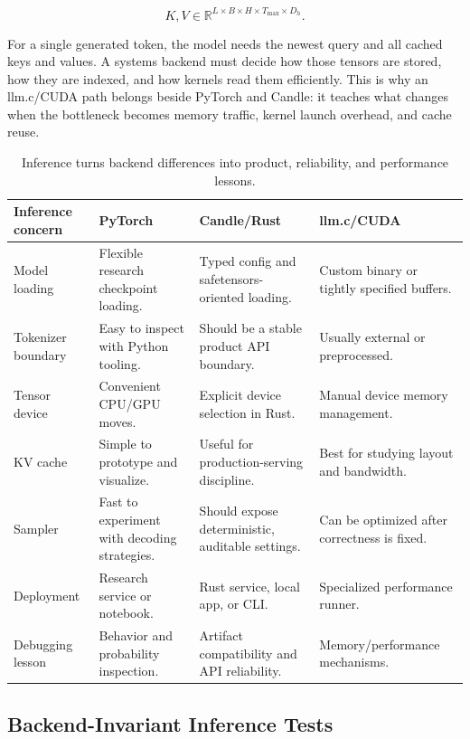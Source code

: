 \[
K,V \in \mathbb{R}^{L \times B \times H \times T_{\max} \times D_h}.
\]

For a single generated token, the model needs the newest query and all cached keys and
values. A systems backend must decide how those tensors are stored, how they are indexed,
and how kernels read them efficiently. This is why an llm.c/CUDA path belongs beside
PyTorch and Candle: it teaches what changes when the bottleneck becomes memory traffic,
kernel launch overhead, and cache reuse.

\begin{table}[htbp]
\centering
\small
\renewcommand{\arraystretch}{1.25}
\begin{tabular}{p{}p{}p{}p{}}
\toprule
\textbf{Inference concern} & \textbf{PyTorch} & \textbf{Candle/Rust} & \textbf{llm.c/CUDA} \\
\midrule
Model loading &
Flexible research checkpoint loading. &
Typed config and safetensors-oriented loading. &
Custom binary or tightly specified buffers. \\
Tokenizer boundary &
Easy to inspect with Python tooling. &
Should be a stable product API boundary. &
Usually external or preprocessed. \\
Tensor device &
Convenient CPU/GPU moves. &
Explicit device selection in Rust. &
Manual device memory management. \\
KV cache &
Simple to prototype and visualize. &
Useful for production-serving discipline. &
Best for studying layout and bandwidth. \\
Sampler &
Fast to experiment with decoding strategies. &
Should expose deterministic, auditable settings. &
Can be optimized after correctness is fixed. \\
Deployment &
Research service or notebook. &
Rust service, local app, or CLI. &
Specialized performance runner. \\
Debugging lesson &
Behavior and probability inspection. &
Artifact compatibility and API reliability. &
Memory/performance mechanisms. \\
\bottomrule
\end{tabular}
\caption{Inference turns backend differences into product, reliability, and performance lessons.}
\end{table}

\subsection{Backend-Invariant Inference Tests}


